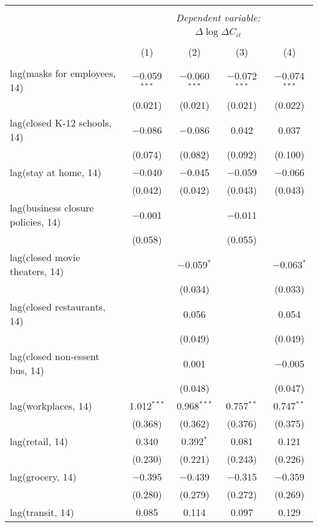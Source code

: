 \begin{tabular}{@{\extracolsep{1pt}}lcccc} 
\\[-1.8ex]\hline 
\hline \\[-1.8ex] 
 & \multicolumn{4}{c}{\textit{Dependent variable:}} \\ 
\cline{2-5} 
 & \multicolumn{4}{c}{$\Delta \log \Delta C_{it}$} \\ 
\\[-1.8ex] & (1) & (2) & (3) & (4)\\ 
\hline \\[-1.8ex] 
 lag(masks for employees, 14) & $-$0.059$^{***}$ & $-$0.060$^{***}$ & $-$0.072$^{***}$ & $-$0.074$^{***}$ \\ 
  & (0.021) & (0.021) & (0.021) & (0.022) \\ 
  lag(closed K-12 schools, 14) & $-$0.086 & $-$0.086 & 0.042 & 0.037 \\ 
  & (0.074) & (0.082) & (0.092) & (0.100) \\ 
  lag(stay at home, 14) & $-$0.040 & $-$0.045 & $-$0.059 & $-$0.066 \\ 
  & (0.042) & (0.042) & (0.043) & (0.043) \\ 
  lag(business closure policies, 14) & $-$0.001 &  & $-$0.011 &  \\ 
  & (0.058) &  & (0.055) &  \\ 
  lag(closed movie theaters, 14) &  & $-$0.059$^{*}$ &  & $-$0.063$^{*}$ \\ 
  &  & (0.034) &  & (0.033) \\ 
  lag(closed restaurants, 14) &  & 0.056 &  & 0.054 \\ 
  &  & (0.049) &  & (0.049) \\ 
  lag(closed non-essent bus, 14) &  & 0.001 &  & $-$0.005 \\ 
  &  & (0.048) &  & (0.047) \\ 
  lag(workplaces, 14) & 1.012$^{***}$ & 0.968$^{***}$ & 0.757$^{**}$ & 0.747$^{**}$ \\ 
  & (0.368) & (0.362) & (0.376) & (0.375) \\ 
  lag(retail, 14) & 0.340 & 0.392$^{*}$ & 0.081 & 0.121 \\ 
  & (0.230) & (0.221) & (0.243) & (0.226) \\ 
  lag(grocery, 14) & $-$0.395 & $-$0.439 & $-$0.315 & $-$0.359 \\ 
  & (0.280) & (0.279) & (0.272) & (0.269) \\ 
  lag(transit, 14) & 0.085 & 0.114 & 0.097 & 0.129 \\ 

\end{tabular}
